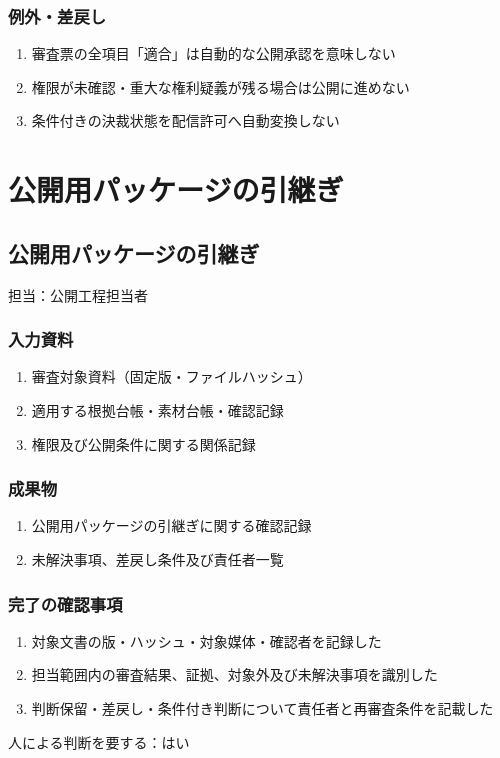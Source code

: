 \documentclass[a4paper,11pt]{article}
\begin{document}
\subsubsection*{例外・差戻し}
\begin{enumerate}[leftmargin=2em,itemsep=0.35em]
\item 審査票の全項目「適合」は自動的な公開承認を意味しない
\item 権限が未確認・重大な権利疑義が残る場合は公開に進めない
\item 条件付きの決裁状態を配信許可へ自動変換しない
\end{enumerate}
\section{公開用パッケージの引継ぎ}
\subsection{公開用パッケージの引継ぎ}
\par 担当：公開工程担当者\par\medskip
\subsubsection*{入力資料}
\begin{enumerate}[leftmargin=2em,itemsep=0.35em]
\item 審査対象資料（固定版・ファイルハッシュ）
\item 適用する根拠台帳・素材台帳・確認記録
\item 権限及び公開条件に関する関係記録
\end{enumerate}
\subsubsection*{成果物}
\begin{enumerate}[leftmargin=2em,itemsep=0.35em]
\item 公開用パッケージの引継ぎに関する確認記録
\item 未解決事項、差戻し条件及び責任者一覧
\end{enumerate}
\subsubsection*{完了の確認事項}
\begin{enumerate}[leftmargin=2em,itemsep=0.35em]
\item 対象文書の版・ハッシュ・対象媒体・確認者を記録した
\item 担当範囲内の審査結果、証拠、対象外及び未解決事項を識別した
\item 判断保留・差戻し・条件付き判断について責任者と再審査条件を記載した
\end{enumerate}
\par 人による判断を要する：はい\par\medskip
\end{document}
